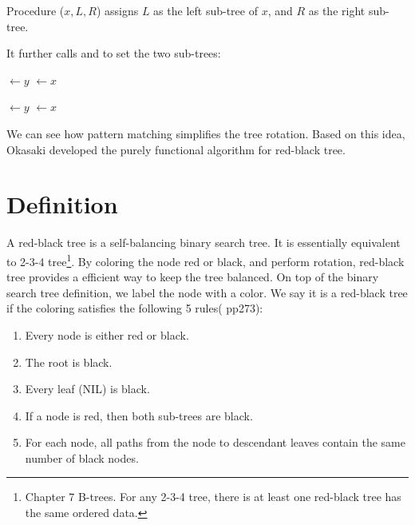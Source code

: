 \documentclass[b5paper]{article}
\begin{document}
Procedure ($x, L, R$) assigns $L$ as the left sub-tree of $x$, and $R$ as the right sub-tree.

\begin{algorithmic}[1]
  \State {}
  \State {}
\EndFunction
\end{algorithmic}

It further calls  and  to set the two sub-trees:

\begin{algorithmic}[1]
  \State {} $\gets y$
     $\gets x$
  \EndIf
\EndFunction

\Statex

  \State {} $\gets y$
     $\gets x$
  \EndIf
\EndFunction
\end{algorithmic}

We can see how pattern matching simplifies the tree rotation. Based on this idea, Okasaki developed the purely functional algorithm for red-black tree\cite{okasaki}.

\begin{Exercise}
\end{Exercise}

\section{Definition}

A red-black tree is a self-balancing binary search tree\cite{wiki-rbt}. It is essentially equivalent to 2-3-4 tree\footnote{Chapter 7 B-trees. For any 2-3-4 tree, there is at least one red-black tree has the same ordered data.}. By coloring the node red or black, and perform rotation, red-black tree provides a efficient way to keep the tree balanced. On top of the binary search tree definition, we label the node with a color. We say it is a red-black tree if the coloring satisfies the following 5 rules(\cite{CLRS} pp273):

\begin{enumerate}
\item Every node is either red or black.
\item The root is black.
\item Every leaf (NIL) is black.
\item If a node is red, then both sub-trees are black.
\item For each node, all paths from the node to descendant leaves contain the same number of black nodes.
\end{enumerate}
\end{document}

